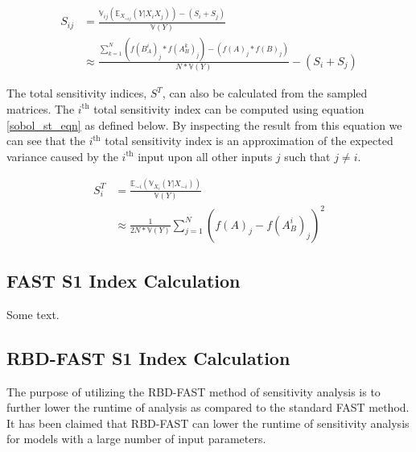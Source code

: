 \begin{equation} \label{sobol_s2_eqn}
  \begin{split}
    S_{ij} & = \frac{\mathbb{V}_{ij}\left(\mathbb{E}_{X_{\sim ij}}(Y | X_i X_j)\right)  - (S_i + S_j)}{\mathbb{V}(Y)} \\
     & \approx \frac{\sum_{k=1}^{N} \left(f(B_{A}^{i})_j * f(A_{B}^{k})_j\right) - \left(f(A)_j * f(B)_j\right)}{N * \mathbb{V}(Y)} - (S_i + S_j)
  \end{split}
\end{equation}

The total sensitivity indices, $S^T$, can also be calculated from the sampled matrices. The $i^{\text{th}}$ total sensitivity index can be computed using equation \ref{sobol_st_eqn} as defined below. By inspecting the result from this equation we can see that the $i^{\text{th}}$ total sensitivity index is an approximation of the expected variance caused by the $i^{\text{th}}$ input upon all other inputs $j$ such that $j\neq i$.

\begin{equation} \label{sobol_st_eqn}
  \begin{split}
    S_i^T & = \frac{\mathbb{E}_{\sim i}\left(\mathbb{V}_{X_i}(Y | X_{\sim i})\right)}{\mathbb{V}(Y)} \\
    & \approx \frac{1}{2N * \mathbb{V}(Y)} \sum_{j=1}^{N} \left(f(A)_j - f(A_{B}^{i})_j\right)^2
  \end{split}
\end{equation}

\subsection{FAST S1 Index Calculation\label{sec:fast_analysis}}
Some text.

\subsection{RBD-FAST S1 Index Calculation\label{sec:rbd_fast_analysis}}
The purpose of utilizing the RBD-FAST method of sensitivity analysis is to further lower the runtime of analysis as compared to the standard FAST method. It has been claimed that RBD-FAST can lower the runtime of sensitivity analysis for models with a large number of input parameters.


